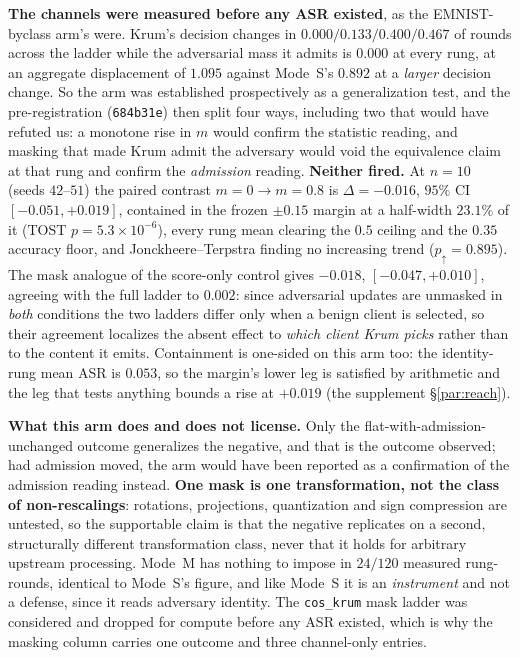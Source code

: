 \documentclass{article}
\begin{document}
\textbf{The channels were measured before any ASR existed}, as the EMNIST-byclass arm's were. Krum's decision changes in $0.000/0.133/0.400/0.467$ of rounds across the ladder while the adversarial mass it admits is $0.000$ at every rung, at an aggregate displacement of $1.095$ against Mode~S's $0.892$ at a \emph{larger} decision change. So the arm was established prospectively as a generalization test, and the pre-registration (\texttt{684b31e}) then split four ways, including two that would have refuted us: a monotone rise in $m$ would confirm the statistic reading, and masking that made Krum admit the adversary would void the equivalence claim at that rung and confirm the \emph{admission} reading. \textbf{Neither fired.} At $n{=}10$ (seeds $42$--$51$) the paired contrast $m{=}0 \to m{=}0.8$ is $\Delta=-0.016$, $95\%$ CI $[-0.051,+0.019]$, contained in the frozen $\pm0.15$ margin at a half-width $23.1\%$ of it (TOST $p{=}5.3{\times}10^{-6}$), every rung mean clearing the $0.5$ ceiling and the $0.35$ accuracy floor, and Jonckheere--Terpstra finding no increasing trend ($p_{\uparrow}{=}0.895$). The mask analogue of the score-only control gives $-0.018$, $[-0.047,+0.010]$, agreeing with the full ladder to $0.002$: since adversarial updates are unmasked in \emph{both} conditions the two ladders differ only when a benign client is selected, so their agreement localizes the absent effect to \emph{which client Krum picks} rather than to the content it emits. Containment is one-sided on this arm too: the identity-rung mean ASR is $0.053$, so the margin's lower leg is satisfied by arithmetic and the leg that tests anything bounds a rise at $+0.019$ (the supplement §\ref{par:reach}).

\textbf{What this arm does and does not license.} Only the flat-with-admission-unchanged outcome generalizes the negative, and that is the outcome observed; had admission moved, the arm would have been reported as a confirmation of the admission reading instead. \textbf{One mask is one transformation, not the class of non-rescalings}: rotations, projections, quantization and sign compression are untested, so the supportable claim is that the negative replicates on a second, structurally different transformation class, never that it holds for arbitrary upstream processing. Mode~M has nothing to impose in $24/120$ measured rung-rounds, identical to Mode~S's figure, and like Mode~S it is an \emph{instrument} and not a defense, since it reads adversary identity. The \texttt{cos\_krum} mask ladder was considered and dropped for compute before any ASR existed, which is why the masking column carries one outcome and three channel-only entries.
\end{document}
